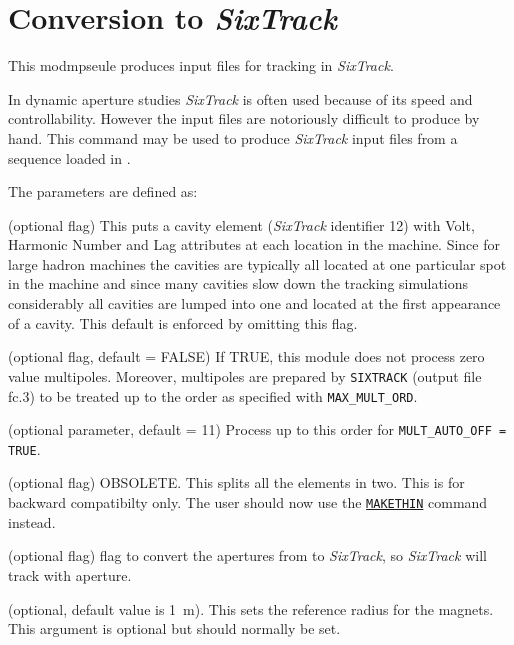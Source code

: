 

\chapter{Conversion to \textit{SixTrack}}
\label{chap:sixtrack}

This modmpseule produces input files for tracking in \textit{SixTrack}.

In dynamic aperture studies \textit{SixTrack}\cite{SixTrack} is often
used because of its  speed and controllability. However the input files
are notoriously difficult to produce by hand. This command may be used
to produce \textit{SixTrack} input files from a sequence loaded in \madx.

 
The parameters are defined as: 
\begin{madlist}
    (optional flag) This puts a cavity element
   (\textit{SixTrack} identifier 12) with Volt, Harmonic Number and Lag
   attributes at each location in the machine. Since for large hadron
   machines the cavities are typically all located at one particular
   spot in the machine and since many cavities slow down the tracking
   simulations considerably all cavities are lumped into one and located
   at the first appearance of a cavity. This default is enforced by
   omitting this flag.  

    (optional flag, default = FALSE) If
   TRUE, this module does not process zero value multipoles. 
   Moreover, multipoles are prepared by \texttt{SIXTRACK}
   (output file fc.3) to be treated up to the order as specified with
   {\tt MAX\_MULT\_ORD}.  

    (optional parameter, default = 11) Process up
   to this order for {\tt MULT\_AUTO\_OFF = TRUE}.  

    (optional flag) OBSOLETE. This splits all the
   elements in  two. This is for backward compatibilty only. The user
   should now use the \hyperref[chap:makethin]{\tt MAKETHIN} command
   instead.   

    (optional flag) flag to convert the apertures
   from \madx to \textit{SixTrack}, so \textit{SixTrack} will track
   with aperture.   

    (optional, default value is 1~m). This sets the
   reference  radius for the magnets. This argument is optional but
   should normally be set.  
\end{madlist}

